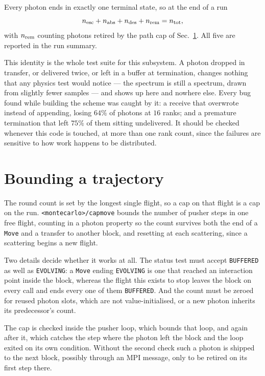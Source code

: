 \documentclass[11pt]{article}
\begin{document}
Every photon ends in exactly one terminal state, so at the end of a run
\begin{equation}
  n_{\rm esc} + n_{\rm abs} + n_{\rm des} + n_{\rm rem} = n_{\rm tot} ,
  \label{eq:conservation}
\end{equation}
with $n_{\rm rem}$ counting photons retired by the path cap of
Sec.~\ref{sec:capmove}. All five are reported in the run summary.

This identity is the whole test suite for this subsystem. A photon dropped in transfer, or
delivered twice, or left in a buffer at termination, changes nothing that any physics test
would notice --- the spectrum is still a spectrum, drawn from slightly fewer samples --- and
shows up here and nowhere else. Every bug found while building the scheme was caught by it:
a receive that overwrote instead of appending, losing $64\%$ of photons at $16$ ranks; and a
premature termination that left $75\%$ of them sitting undelivered. It should be checked
whenever this code is touched, at more than one rank count, since the failures are
sensitive to how work happens to be distributed.

\section{Bounding a trajectory}
\label{sec:capmove}

The round count is set by the longest single flight, so a cap on that flight is a cap on
the run. \texttt{<montecarlo>/capmove} bounds the number of pusher steps in one free
flight, counting in a photon property so the count survives both the end of a \texttt{Move}
and a transfer to another block, and resetting at each scattering, since a scattering
begins a new flight.

Two details decide whether it works at all. The status test must accept \texttt{BUFFERED}
as well as \texttt{EVOLVING}: a \texttt{Move} ending \texttt{EVOLVING} is one that reached
an interaction point inside the block, whereas the flight this exists to stop leaves the
block on every call and ends every one of them \texttt{BUFFERED}. And the count must be
zeroed for reused photon slots, which are not value-initialised, or a new photon inherits
its predecessor's count.

The cap is checked inside the pusher loop, which bounds that loop, and again after it,
which catches the step where the photon left the block and the loop exited on its own
condition. Without the second check such a photon is shipped to the next block, possibly
through an MPI message, only to be retired on its first step there.
\end{document}
